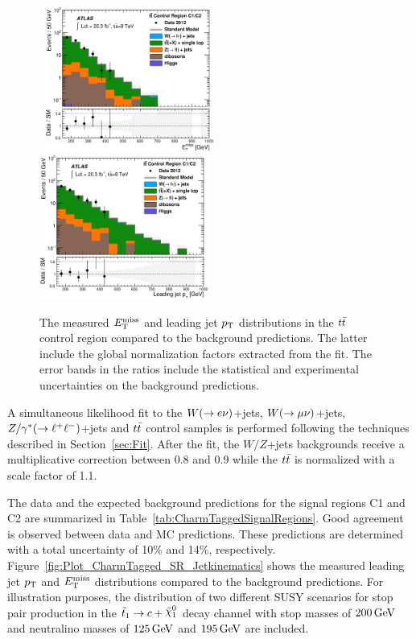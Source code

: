 \begin{figure}[!ht]
  \begin{center}
    \mbox{
      \includegraphics[width=0.495\textwidth]{Appendix_CharmTagged/Figures/can_VR_TTBarll_C1_metnomu_final.eps}
      \includegraphics[width=0.495\textwidth]{Appendix_CharmTagged/Figures/can_VR_TTBarll_C1_jet1PtWithEle_final.eps}
    }
  \end{center}
  \caption[$\met$ and leading jet $\pt$ distributions in the $\ttbar$ control region for the charm-tagged selection, after the normalization factors extracted from the fit have been applied.]{The measured $\met$ and leading jet $\pt$ distributions in the $\ttbar$ control region compared to the background predictions. The latter include the global normalization factors extracted from the fit. The error bands in the ratios include the statistical and experimental uncertainties on the background predictions.}
  \label{fig:Plot_CharmTagged_ttbar_Jetkinematics}
\end{figure}


A simultaneous likelihood fit to the $W(\rightarrow e \nu)$+jets, $W(\rightarrow \mu \nu)$+jets, $Z/\gamma^*(\rightarrow\ell^+\ell^-)$+jets and $\ttbar$ control samples is performed following the techniques described in Section~\ref{sec:Fit}.
After the fit, the $W/Z$+jets backgrounds receive a multiplicative correction between 0.8 and 0.9 while the $\ttbar$ is normalized with a scale factor of 1.1.

The data and the expected background predictions for the signal regions C1 and C2 are summarized in Table~\ref{tab:CharmTaggedSignalRegions}.
Good agreement is observed between data and MC predictions.
These predictions are determined with a total uncertainty of 10\% and 14\%, respectively.
Figure~\ref{fig:Plot_CharmTagged_SR_Jetkinematics} shows the measured leading jet $\pt$ and $\met$ distributions compared to the background predictions.
For illustration purposes, the distribution of two different SUSY scenarios for stop pair production in the $\stoptocharm$ decay channel with stop masses of $\unit[200]{GeV}$ and neutralino masses of $\unit[125]{GeV}$ and $\unit[195]{GeV}$ are included.

